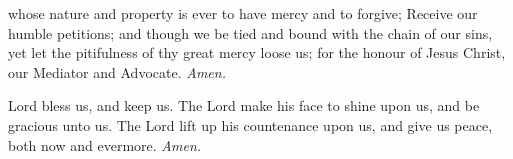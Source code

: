  whose nature and property is ever to have mercy and to forgive; Receive our humble petitions; and though we be tied and bound with the chain of our sins, yet let the pitifulness of thy great mercy loose us; for the honour of Jesus Christ, our Mediator and Advocate. \textit{Amen.}

 Lord bless us, and keep us. The Lord make his face to shine upon us, and be gracious unto us. The Lord lift up his countenance upon us, and give us peace, both now and evermore. \textit{Amen.}
